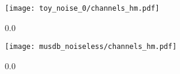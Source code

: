 \begin{subfigure}{0.35\textwidth}
    \texttt{[image: toy\_noise\_0/channels\_hm.pdf]}%
    \caption{0.0}%
    \label{fig:noiseless_channels_toy}%
\end{subfigure}
\begin{subfigure}{0.35\textwidth}
    \texttt{[image: musdb\_noiseless/channels\_hm.pdf]}%
    \caption{0.0}%
    \label{fig:noiseless_channels_musdb}%
\end{subfigure}
